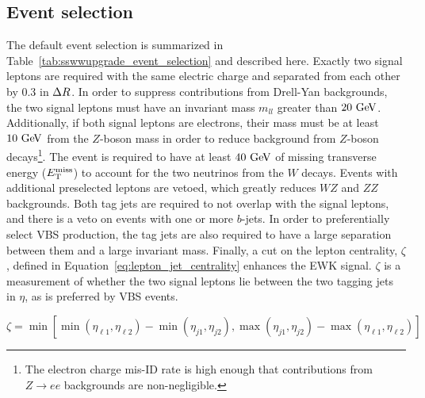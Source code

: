 \subsection{Event selection}\label{sswwupgrade:event_selection}
The default event selection is summarized in Table~\ref{tab:sswwupgrade_event_selection} and described here.
Exactly two signal leptons are required with the same electric charge and separated from each other by 0.3 in $\Delta R$.
In order to suppress contributions from Drell-Yan backgrounds, the two signal leptons must have an invariant mass $m_{ll}$ greater than $20\gev$.
Additionally, if both signal leptons are electrons, their mass must be at least $10\gev$ from the $Z$-boson mass in order to reduce background from $Z$-boson decays\footnote{The electron charge mis-ID rate is high enough that contributions from $Z\rightarrow ee$ backgrounds are non-negligible.}.
The event is required to have at least $40\gev$ of missing transverse energy ($E_{\mathrm{T}}^{\mathrm{miss}}$) to account for the two neutrinos from the $W$ decays.
Events with additional preselected leptons are vetoed, which greatly reduces $WZ$ and $ZZ$ backgrounds.
Both tag jets are required to not overlap with the signal leptons, and there is a veto on events with one or more $b$-jets.
In order to preferentially select VBS production, the tag jets are also required to have a large separation between them and a large invariant mass.
Finally, a cut on the lepton centrality, $\zeta$, defined in Equation~\ref{eq:lepton_jet_centrality} enhances the EWK \ssww signal.
$\zeta$ is a measurement of whether the two signal leptons lie between the two tagging jets in $\eta$, as is preferred by VBS events.

\begin{equation}
\zeta = \min [\min (\eta_{\ell1}, \eta_{\ell2} )-\min(\eta_{j1},\eta_{j2}), \max(\eta_{j1},\eta_{j2})-\max(\eta_{\ell1},\eta_{\ell2}) ]
\label{eq:lepton_jet_centrality}
\end{equation}

